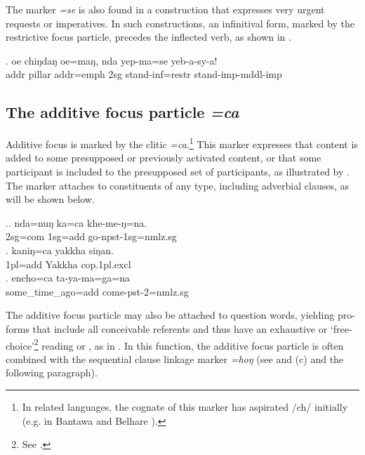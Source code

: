  The marker \emph{=se} is also found in a construction that expresses very urgent requests or imperatives. In such constructions, an infinitival form, marked by the restrictive focus particle, precedes the inflected verb, as shown in \Next.

 \exg. oe     chiŋdaŋ            oe=maŋ,       nda yep-ma=se               yeb-a-sy-a!\\
 {\sc addr} pillar {\sc addr=emph} {\sc 2sg} stand{\sc -inf=restr} stand{\sc -imp-mddl-imp}\\
  
 
 
\subsection{The additive focus particle \emph{=ca}}\label{ptcl-additive}

 Additive focus is marked by the clitic \emph{=ca}.\footnote{In related languages, the cognate of this marker has aspirated /ch/ initially (e.g. in  Bantawa and Belhare \citep{Doornenbal2009A-grammar, Bickel2003Belhare}).} This marker expresses that content is added to some presupposed or previously activated  content, or that some participant is included to the presupposed set of participants, as illustrated by \Next. The marker attaches  to constituents of any type, including adverbial clauses, as will be shown below. 
 
 \ex.\ag. nda=nuŋ ka=ca khe-me-ŋ=na.\\
 {\sc 2sg=com}  {\sc 1sg=add}  go{\sc -npst-1sg=nmlz.sg}\\
 \bg.             kaniŋ=ca        yakkha          siŋan.\\
 {\sc 1pl=add} Yakkha {\sc cop.1pl.excl}\\
  
\bg.  encho=ca                ta-ya-ma=ga=na\\
some\_time\_ago{\sc =add} come{\sc -pst-2=nmlz.sg}\\
 
 
The additive focus particle  may also  be attached to question words,  yielding pro-forms that include all conceivable referents and thus have an exhaustive or ‘free-choice’\footnote{See \citet[980]{Koenig1993_Focus}.}  reading  or ,  as in \Next. In this function, the additive focus particle is often combined with the sequential clause linkage marker \emph{=hoŋ} (see \Next[b] and (c) and the following paragraph). 

